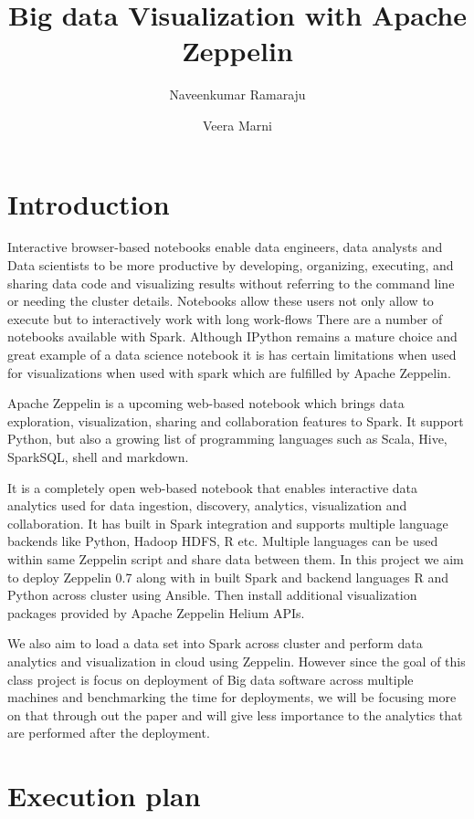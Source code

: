 \documentclass[9pt,twocolumn,twoside]{../../styles/osajnl}
\title{Big data Visualization with Apache Zeppelin}
\author[1, *]{Naveenkumar Ramaraju}
\author[1,*]{Veera Marni}
\affil[1]{School of Informatics and Computing, Bloomington, IN 47408, U.S.A.}
\affil[*]{Corresponding authors: naveenkumar2703@gmail.com, narayana1043@gmail.com}
\begin{document}
\maketitle

\section{Introduction}

Interactive browser-based notebooks enable data engineers, data 
analysts and Data scientists to be more productive by developing, 
organizing, executing, and sharing data code and visualizing results 
without referring to the command line or needing the cluster details. 
Notebooks allow these users not only allow to execute but to 
interactively work with long work-flows  There are a number of 
notebooks available with Spark. Although IPython remains a mature 
choice and great example of a data science notebook it is has certain 
limitations when used for visualizations when used with spark which 
are fulfilled by Apache Zeppelin. 

Apache Zeppelin\cite{www-zeppelin} is a upcoming web-based notebook 
which brings data exploration, visualization, sharing and 
collaboration features to Spark.   It support Python, but also a 
growing list of programming languages such as Scala, Hive, SparkSQL, 
shell and markdown. 

It is a completely open web-based notebook that enables interactive 
data analytics used for data ingestion, discovery, analytics, 
visualization and collaboration. It has built in Spark integration 
and supports multiple language backends like Python, Hadoop HDFS, R 
etc.  Multiple languages can be used within same Zeppelin script and 
share data between them. In this project we aim to deploy Zeppelin 
0.7 along with in built Spark and backend languages R and Python 
across cluster using Ansible. Then install additional  visualization 
packages provided by Apache Zeppelin Helium APIs.

We also aim to load a data set into Spark across cluster and perform 
data analytics and visualization in cloud using Zeppelin. However 
since the goal of this class project is focus on deployment of Big 
data software across multiple machines and benchmarking the time for 
deployments, we will be focusing more on that through out the paper 
and will give less importance to the analytics that are performed 
after the deployment.

\section{Execution plan}
\end{document}
